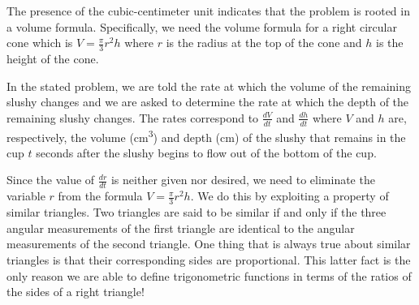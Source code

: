 \documentclass[10pt,oneside,]{book}
\theoremstyle{plain}
\theoremstyle{definition}
\numberwithin{equation}{section}
\newcounter{figstack}
\newlength\fight
\newcommand\pushValignCaptionBottom[5][b]{%
\stepcounter{figstack}%
\expandafter\def\csname %
figalign\romannumeral\value{figstack}\endcsname{#1}%
\expandafter\def\csname %
figtype\romannumeral\value{figstack}\endcsname{#2}%
\expandafter\def\csname %
figwd\romannumeral\value{figstack}\endcsname{#3}%
\expandafter\def\csname %
figcontent\romannumeral\value{figstack}\endcsname{#4}%
\expandafter\def\csname %
figcap\romannumeral\value{figstack}\endcsname{#5}%
\setbox0=\hbox{%
\begin{#2}{#3}#4\end{#2}}%
\ifdim\dimexpr\ht0+\dp0\relax>\fight\global\setlength{\fight}{%
\dimexpr\ht0+\dp0\relax}\fi%
}
\newcommand{\lz}[2]{\frac{d#1}{d#2}}
\begin{document}
\begin{exerciselist}
\par
The presence of the cubic-centimeter unit indicates that the problem is rooted in a volume formula. Specifically, we need the volume formula for a right circular cone which is \(V=\frac{\pi}{3}r^2h\) where \(r\) is the radius at the top of the cone and \(h\) is the height of the cone.%
\par
In the stated problem, we are told the rate at which the volume of the remaining slushy changes and we are asked to determine the rate at which the depth of the remaining slushy changes. The rates correspond to \(\lz{V}{t}\) and \(\lz{h}{t}\) where \(V\) and \(h\) are, respectively, the volume (\si{\centi\meter\tothe{3}}) and depth (\si{\centi\meter}) of the slushy that remains in the cup \(t\) seconds after the slushy begins to flow out of the bottom of the cup.%
\par
Since the value of \(\lz{r}{t}\) is neither given nor desired, we need to eliminate the variable \(r\) from the formula \(V=\frac{\pi}{3}r^2h\). We do this by exploiting a property of similar triangles. Two triangles are said to be similar if and only if the three angular measurements of the first triangle are identical to the angular measurements of the second triangle. One thing that is always true about similar triangles is that their corresponding sides are proportional. This latter fact is the only reason we are able to define trigonometric functions in terms of the ratios of the sides of a right triangle!%
\end{exerciselist}
\end{document}
